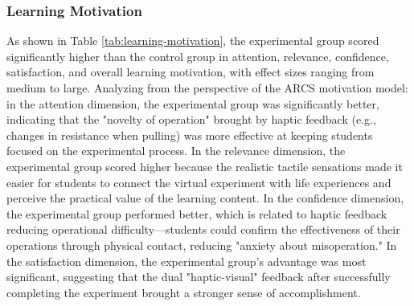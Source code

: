 \documentclass[runningheads]{llncs}
\begin{document}
\subsubsection{Learning Motivation}
As shown in Table \ref{tab:learning-motivation}, the experimental group scored significantly higher than the control group in attention, relevance, confidence, satisfaction, and overall learning motivation, with effect sizes ranging from medium to large. Analyzing from the perspective of the ARCS motivation model: in the attention dimension, the experimental group was significantly better, indicating that the "novelty of operation" brought by haptic feedback (e.g., changes in resistance when pulling) was more effective at keeping students focused on the experimental process. In the relevance dimension, the experimental group scored higher because the realistic tactile sensations made it easier for students to connect the virtual experiment with life experiences and perceive the practical value of the learning content. In the confidence dimension, the experimental group performed better, which is related to haptic feedback reducing operational difficulty—students could confirm the effectiveness of their operations through physical contact, reducing "anxiety about misoperation." In the satisfaction dimension, the experimental group's advantage was most significant, suggesting that the dual "haptic-visual" feedback after successfully completing the experiment brought a stronger sense of accomplishment.
\end{document}

